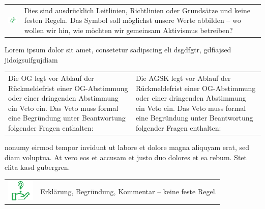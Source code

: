 \documentclass[a4paper,
  ]{scrartcl}
\newcommand{\announcement}[1]{%
\begin{tabularx}{\textwidth}{p{1.5cm}X}
\centering\includegraphics[width=1.5cm]{Lautsprecher.png} & #1 \\
\end{tabularx}
}
\newcommand{\hint}[1]{%
\begin{tabularx}{\textwidth}{p{1.5cm}X}
\centering\includegraphics[width=1.3cm]{Fragezeichen-Hand.png} & #1 \\
\end{tabularx}
}
\newcommand{\paralleltext}[2]{\\
\begin{tabularx}{\textwidth}{X X}
  
#1 & #2 \\
\end{tabularx}
}
\begin{document}
\announcement{Dies sind ausdrücklich Leitlinien, Richtlinien oder Grundsätze und keine festen Regeln. Das Symbol soll möglichst unsere Werte abbilden – wo wollen wir hin, wie möchten wir gemeinsam Aktivismus betreiben?}
Lorem ipsum dolor sit amet, consetetur sadipscing eli dsgdfgtr, gdfiajsed jidoigsuifgujdiam
\paralleltext{
  Die OG legt vor Ablauf der Rückmeldefrist einer OG-Abstimmung oder einer dringenden Abstimmung ein Veto ein. Das Veto muss formal eine Begründung unter Beantwortung folgender Fragen enthalten:
}{
  Die AGSK legt vor Ablauf der Rückmeldefrist einer OG-Abstimmung oder einer dringenden Abstimmung ein Veto ein. Das Veto muss formal eine Begründung unter Beantwortung folgender Fragen enthalten:
}


nonumy eirmod tempor invidunt ut labore et dolore magna aliquyam erat, sed diam voluptua. At vero eos et accusam et justo duo dolores et ea rebum. Stet clita kasd gubergren.

\hint{Erklärung, Begründung, Kommentar – keine feste Regel.}
\end{document}
